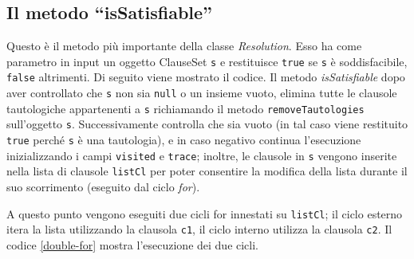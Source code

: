 \documentclass[a4paper,12pt]{report}
\begin{document}
\subsection{Il metodo ``isSatisfiable''}
\label{isSat}
Questo è il metodo più importante della classe \textit{Resolution}. Esso ha come parametro in input un oggetto ClauseSet \texttt{s} e restituisce \texttt{true} se \texttt{s} è soddisfacibile, \texttt{false} altrimenti. Di seguito viene mostrato il codice. Il metodo \textit{isSatisfiable} dopo aver controllato che \texttt{s} non sia \texttt{null} o un insieme vuoto, elimina tutte le clausole tautologiche appartenenti a \texttt{s} richiamando il metodo \texttt{removeTautologies} sull'oggetto \texttt{s}. Successivamente controlla che sia vuoto (in tal caso viene restituito \texttt{true} perché \texttt{s} è una tautologia), e in caso negativo continua l'esecuzione inizializzando i campi \texttt{visited} e \texttt{trace}; inoltre, le clausole in \texttt{s} vengono inserite nella lista di clausole \texttt{listCl} per poter consentire la modifica della lista durante il suo scorrimento (eseguito dal ciclo \textit{for}). 

A questo punto vengono eseguiti due cicli for innestati su \texttt{listCl}; il ciclo esterno itera la lista utilizzando la clausola \texttt{c1}, il ciclo interno utilizza la clausola \texttt{c2}. Il codice \ref{double-for} mostra l'esecuzione dei due cicli. 
\end{document}
